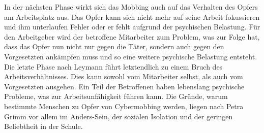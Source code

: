 In der nächsten Phase wirkt sich das Mobbing auch auf das Verhalten des Opfers am Arbeitsplatz aus.
Das Opfer kann sich nicht mehr auf seine Arbeit fokussieren und ihm unterlaufen Fehler oder er fehlt aufgrund der psychischen Belastung.
Für den Arbeitgeber wird der betroffene Mitarbeiter zum Problem, was zur Folge hat, dass das Opfer nun nicht nur gegen die Täter, sondern auch gegen den Vorgesetzten ankämpfen muss und so eine weitere psychische Belastung entsteht.
Die letzte Phase nach Leymann führt letztendlich zu einem Bruch des Arbeitsverhältnisses.
Dies kann sowohl vom Mitarbeiter selbst, als auch vom Vorgesetzten ausgehen.
Ein Teil der Betroffenen haben lebenslang psychische Probleme, was zur Arbeitsunfähigkeit führen kann.
Die Gründe, warum bestimmte Menschen zu Opfer von Cybermobbing werden, liegen nach Petra Grimm vor allem im Anders-Sein, der sozialen Isolation und der geringen Beliebtheit in der Schule. \cite[S.\,230]{PG08}
